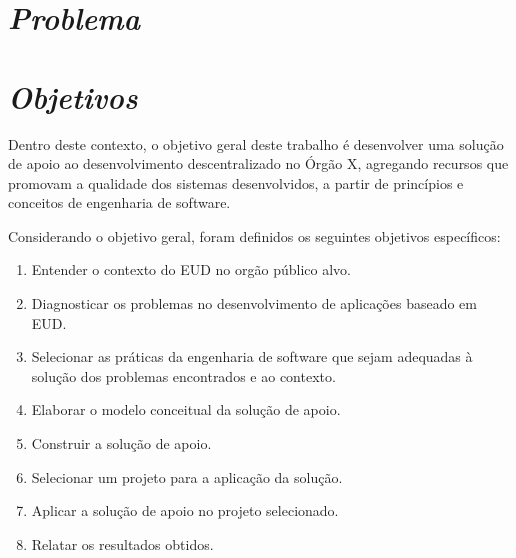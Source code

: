 \section{\textit{Problema}}



\section{\textit{Objetivos}}

Dentro deste contexto, o objetivo geral deste trabalho é desenvolver uma solução de apoio ao desenvolvimento descentralizado no Órgão X, agregando recursos que promovam a qualidade dos sistemas desenvolvidos, a partir de princípios e conceitos de engenharia de software.

Considerando o objetivo geral, foram definidos os seguintes objetivos específicos:

\begin{enumerate}
	\item Entender o contexto do EUD no orgão público alvo.
	\item Diagnosticar os problemas no desenvolvimento de aplicações baseado em EUD.
	\item Selecionar as práticas da engenharia de software que sejam adequadas à solução dos problemas encontrados e ao contexto.
	\item Elaborar o modelo conceitual da solução de apoio.
	\item Construir a solução de apoio.
	\item Selecionar um projeto para a aplicação da solução.
	\item Aplicar a solução de apoio no projeto selecionado.
	\item Relatar os resultados obtidos.
\end{enumerate}

